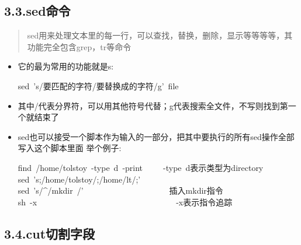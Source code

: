 \documentclass{article}
\begin{document}
\subsection{3.3.\hspace*{0.5em}sed命令}\label{sec-sed}%

\begin{quote}%

\noindent{}sed用来处理文本里的每一行，可以查找，替换，删除，显示等等等等，其功能完全包含grep，tr等命令 %
\end{quote}%

\begin{itemize}[noitemsep,topsep=\mdcompacttopsep]%

\item{}它的最为常用的功能就是s:  
\begin{mdpre}%
\noindent sed~'s/要匹配的字符/要替换成的字符/g'~file~~%
\end{mdpre}%

\item{}其中/代表分界符，可以用其他符号代替；g代表搜索全文件，不写则找到第一个就结束了 %

\item{}sed也可以接受一个脚本作为输入的一部分，把其中要执行的所有sed操作全部写入这个脚本里面\mdbr
{}举个例子: 
\begin{mdpre}%
\noindent find~/home/tolstoy~-type~d~-print~\textbar{}~~~~-type~d表示类型为directory\\
sed~'s;/home/tolstoy/;/home/lt/;'~\textbar{}\\
sed~'s/\textasciicircum{}/mkdir~/'~\textbar{}~~~~~~~~~~~~~~~~~~~~插入mkdir指令\\
sh~-x~~~~~~~~~~~~~~~~~~~~~~~~~~~~~~~~~~-x表示指令追踪%
\end{mdpre}%
\end{itemize}%

\subsection{3.4.\hspace*{0.5em}cut切割字段}\label{sec-cut}%
\end{document}
